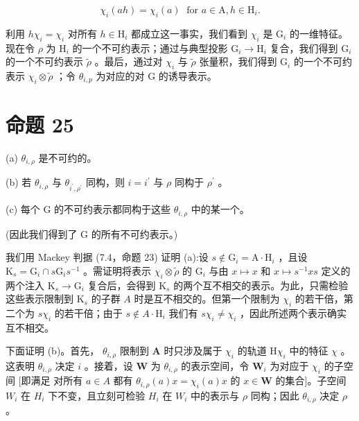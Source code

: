 \documentclass[10pt]{article}
\begin{document}
\[
{\chi }_{i}\left( {ah}\right)  = {\chi }_{i}\left( a\right) \;\text{ for }a \in  \mathrm{A},h \in  {\mathrm{H}}_{i}.
\]

利用 \(h{\chi }_{i} = {\chi }_{i}\) 对所有 \(h \in  {\mathrm{H}}_{i}\) 都成立这一事实，我们看到 \({\chi }_{i}\) 是 \({\mathrm{G}}_{i}\) 的一维特征。现在令 \(\rho\) 为 \({\mathrm{H}}_{i}\) 的一个不可约表示；通过与典型投影 \({\mathrm{G}}_{i} \rightarrow  {\mathrm{H}}_{i}\) 复合，我们得到 \({\mathrm{G}}_{i}\) 的一个不可约表示 \(\widetilde{\rho }\) 。最后，通过对 \({\chi }_{i}\) 与 \(\widetilde{\rho }\) 张量积，我们得到 \({\mathrm{G}}_{i}\) 的一个不可约表示 \({\chi }_{i} \otimes  \widetilde{\rho }\) ；令 \({\theta }_{i,p}\) 为对应的对 \(\mathrm{G}\) 的诱导表示。

\section*{命题 25}

(a) \({\theta }_{i,\rho }\) 是不可约的。

(b) 若 \({\theta }_{i,\rho }\) 与 \({\theta }_{{i}^{\prime },{\rho }^{\prime }}\) 同构，则 \(i = {i}^{\prime }\) 与 \(\rho\) 同构于 \({\rho }^{\prime }\) 。

(c) 每个 \(\mathrm{G}\) 的不可约表示都同构于这些 \({\theta }_{i,\rho }\) 中的某一个。

(因此我们得到了 G 的所有不可约表示。)

我们用 Mackey 判据 (7.4，命题 23) 证明 (a):设 \(s \notin  {\mathrm{G}}_{i} = \mathrm{A} \cdot  {\mathrm{H}}_{i}\) ，且设 \({\mathrm{K}}_{s} = {\mathrm{G}}_{i} \cap  s{\mathrm{G}}_{i}{s}^{-1}\) 。需证明将表示 \({\chi }_{i} \otimes  \widetilde{\rho }\) 的 \({\mathrm{G}}_{i}\) 与由 \(x \mapsto  x\) 和 \(x \mapsto  {s}^{-1}{xs}\) 定义的两个注入 \({\mathrm{K}}_{s} \rightarrow  {\mathrm{G}}_{i}\) 复合后，会得到 \({\mathrm{K}}_{s}\) 的两个互不相交的表示。为此，只需检验这些表示限制到 \({\mathrm{K}}_{s}\) 的子群 \(A\) 时是互不相交的。但第一个限制为 \({\chi }_{i}\) 的若干倍，第二个为 \(s{\chi }_{i}\) 的若干倍；由于 \(s \notin  A \cdot  {\mathrm{H}}_{i}\) 我们有 \(s{\chi }_{i} \neq  {\chi }_{i}\) ，因此所述两个表示确实互不相交。

下面证明 (b)。首先， \({\theta }_{i,\rho }\) 限制到 \(\mathbf{A}\) 时只涉及属于 \({\chi }_{i}\) 的轨道 \(\mathrm{H}{\chi }_{i}\) 中的特征 \(\chi\) 。这表明 \({\theta }_{i,\rho }\) 决定 \(i\) 。接着，设 \(\mathbf{W}\) 为 \({\theta }_{i,\rho }\) 的表示空间，令 \({\mathbf{W}}_{i}\) 为对应于 \({\chi }_{i}\) 的子空间 [即满足 对所有 \(a \in  A\) 都有 \({\theta }_{i,\rho }\left( a\right) x = {\chi }_{i}\left( a\right) x\) 的 \(x \in  \mathbf{W}\) 的集合]。子空间 \({W}_{i}\) 在 \({H}_{i}\) 下不变，且立刻可检验 \({H}_{i}\) 在 \({W}_{i}\) 中的表示与 \(\rho\) 同构；因此 \({\theta }_{i,\rho }\) 决定 \(\rho\) 。
\end{document}
